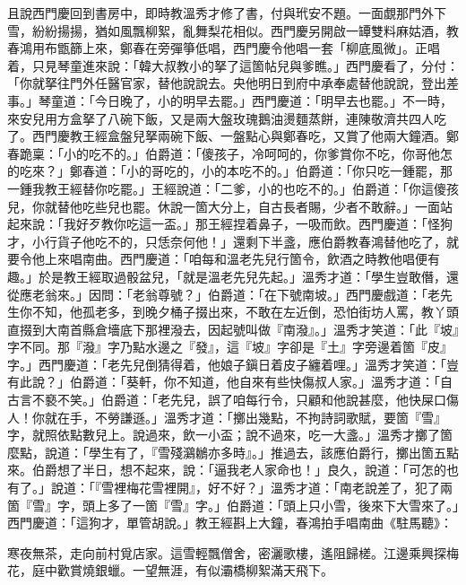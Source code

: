 且說西門慶回到書房中，即時教溫秀才修了書，付與玳安不題。一面覷那門外下雪，紛紛揚揚，猶如風飄柳絮，亂舞梨花相似。西門慶另開啟一罈雙料麻姑酒，教春鴻用布甑篩上來，鄭春在旁彈箏低唱，西門慶令他唱一套「柳底風微」。正唱着，只見琴童進來說：「韓大叔教小的拏了這箇帖兒與爹瞧。」西門慶看了，分付：「你就拏往門外任醫官家，替他說說去。央他明日到府中承奉處替他說說，登出差事。」琴童道：「今日晚了，小的明早去罷。」西門慶道：「明早去也罷。」不一時，來安兒用方盒拏了八碗下飯，又是兩大盤玫瑰鵝油燙麵蒸餅，連陳敬濟共四人吃了。西門慶教王經盒盤兒拏兩碗下飯、一盤點心與鄭春吃，又賞了他兩大鐘酒。鄭春跪稟：「小的吃不的。」伯爵道：「傻孩子，冷呵呵的，你爹賞你不吃，你哥他怎的吃來？」鄭春道：「小的哥吃的，小的本吃不的。」伯爵道：「你只吃一鍾罷，那一鍾我教王經替你吃罷。」王經說道：「二爹，小的也吃不的。」伯爵道：「你這傻孩兒，你就替他吃些兒也罷。休說一箇大分上，自古長者賜，少者不敢辭。」一面站起來說：「我好歹教你吃這一盃。」那王經捏着鼻子，一吸而飲。西門慶道：「怪狗才，小行貨子他吃不的，只恁奈何他！」還剩下半盞，應伯爵教春鴻替他吃了，就要令他上來唱南曲。西門慶道：「咱每和溫老先兒行箇令，飲酒之時教他唱便有趣。」{}於是教王經取過骰盆兒，「就是溫老先兒先起。」溫秀才道：「學生豈敢僭，還從應老翁來。」因問：「老翁尊號？」伯爵道：「在下號南坡。」西門慶戲道：「老先生你不知，他孤老多，到晚夕桶子掇出來，不敢在左近倒，恐怕街坊人罵，教丫頭直掇到大南首縣倉墻底下那裡潑去，因起號叫做『南潑』。」溫秀才笑道：「此『坡』字不同。那『潑』字乃點水邊之『發』，這『坡』字卻是『土』字旁邊着箇『皮』字。」{}西門慶道：「老先兒倒猜得着，他娘子鎭日着皮子纏着哩。」{}溫秀才笑道：「豈有此說？」伯爵道：「葵軒，你不知道，他自來有些快傷叔人家。」溫秀才道：「自古言不褻不笑。」伯爵道：「老先兒，誤了咱每行令，只顧和他說甚麼，他快屎口傷人！你就在手，不勞謙遜。」溫秀才道：「擲出幾點，不拘詩詞歌賦，要箇『雪』字，就照依點數兒上。說過來，飲一小盃；說不過來，吃一大盞。」溫秀才擲了箇麼點，說道：「學生有了，『雪殘鸂鶒亦多時』。」推過去，該應伯爵行，擲出箇五點來。伯爵想了半日，想不起來，說：「逼我老人家命也！」良久，說道：「可怎的也有了。」說道：「『雪裡梅花雪裡開』，好不好？」溫秀才道：「南老說差了，犯了兩箇『雪』字，頭上多了一箇『雪』字。」伯爵道：「頭上只小雪，後來下大雪來了。」西門慶道：「這狗才，單管胡說。」教王經斟上大鐘，春鴻拍手唱南曲《駐馬聽》：

\begin{myquote}
寒夜無茶，走向前村覓店家。這雪輕飄僧舍，密灑歌樓，遙阻歸槎。江邊乘興探梅花，庭中歡賞燒銀蠟。一望無涯，有似灞橋柳絮滿天飛下。
\end{myquote}

